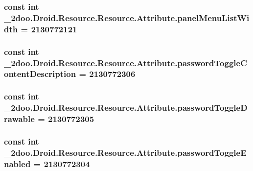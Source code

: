 \hypertarget{class__2doo_1_1_droid_1_1_resource_1_1_attribute_20076e7556589f2e90ff15d4ce23b74b}{
\subsubsection[{panelMenuListWidth}]{\setlength{\rightskip}{0pt plus 5cm}const int \_\-2doo.Droid.Resource.Resource.Attribute.panelMenuListWidth = 2130772121}}
\label{class__2doo_1_1_droid_1_1_resource_1_1_attribute_20076e7556589f2e90ff15d4ce23b74b}


\hypertarget{class__2doo_1_1_droid_1_1_resource_1_1_attribute_17f9df6a36e146535814c79768b46727}{
\subsubsection[{passwordToggleContentDescription}]{\setlength{\rightskip}{0pt plus 5cm}const int \_\-2doo.Droid.Resource.Resource.Attribute.passwordToggleContentDescription = 2130772306}}
\label{class__2doo_1_1_droid_1_1_resource_1_1_attribute_17f9df6a36e146535814c79768b46727}


\hypertarget{class__2doo_1_1_droid_1_1_resource_1_1_attribute_f509fb9d5d17fd17478d6dab376158a6}{
\subsubsection[{passwordToggleDrawable}]{\setlength{\rightskip}{0pt plus 5cm}const int \_\-2doo.Droid.Resource.Resource.Attribute.passwordToggleDrawable = 2130772305}}
\label{class__2doo_1_1_droid_1_1_resource_1_1_attribute_f509fb9d5d17fd17478d6dab376158a6}


\hypertarget{class__2doo_1_1_droid_1_1_resource_1_1_attribute_7de1f37258cb56112d240705619b7d1a}{
\subsubsection[{passwordToggleEnabled}]{\setlength{\rightskip}{0pt plus 5cm}const int \_\-2doo.Droid.Resource.Resource.Attribute.passwordToggleEnabled = 2130772304}}
\label{class__2doo_1_1_droid_1_1_resource_1_1_attribute_7de1f37258cb56112d240705619b7d1a}



